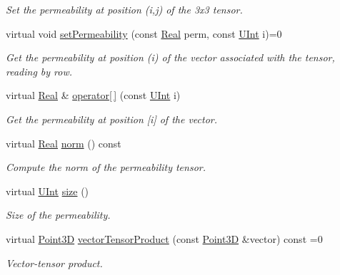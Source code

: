 \begin{DoxyCompactItemize}
\begin{DoxyCompactList}\small\item\em Set the permeability at position (i,j) of the 3x3 tensor. \end{DoxyCompactList}\item 
virtual void \hyperlink{classFVCode3D_1_1PermeabilityBase_a9c4837715f248789eac990148df9ad40}{set\+Permeability} (const \hyperlink{namespaceFVCode3D_a40c1f5588a248569d80aa5f867080e83}{Real} perm, const \hyperlink{namespaceFVCode3D_a4bf7e328c75d0fd504050d040ebe9eda}{U\+Int} i)=0
\begin{DoxyCompactList}\small\item\em Get the permeability at position (i) of the vector associated with the tensor, reading by row. \end{DoxyCompactList}\item 
virtual \hyperlink{namespaceFVCode3D_a40c1f5588a248569d80aa5f867080e83}{Real} \& \hyperlink{classFVCode3D_1_1PermeabilityBase_a01d49e30e1f7cd6856a9eab6195beed1}{operator\mbox{[}$\,$\mbox{]}} (const \hyperlink{namespaceFVCode3D_a4bf7e328c75d0fd504050d040ebe9eda}{U\+Int} i)
\begin{DoxyCompactList}\small\item\em Get the permeability at position \mbox{[}i\mbox{]} of the vector. \end{DoxyCompactList}\item 
virtual \hyperlink{namespaceFVCode3D_a40c1f5588a248569d80aa5f867080e83}{Real} \hyperlink{classFVCode3D_1_1PermeabilityBase_aec31bb1bd0086825bbf2924cce6fc463}{norm} () const 
\begin{DoxyCompactList}\small\item\em Compute the norm of the permeability tensor. \end{DoxyCompactList}\item 
virtual \hyperlink{namespaceFVCode3D_a4bf7e328c75d0fd504050d040ebe9eda}{U\+Int} \hyperlink{classFVCode3D_1_1PermeabilityBase_a5e4bd70177de114e9165f9b81852862c}{size} ()
\begin{DoxyCompactList}\small\item\em Size of the permeability. \end{DoxyCompactList}\item 
virtual \hyperlink{classFVCode3D_1_1Point3D}{Point3D} \hyperlink{classFVCode3D_1_1PermeabilityBase_aa60c227795b5b7dd6413ef90b211875e}{vector\+Tensor\+Product} (const \hyperlink{classFVCode3D_1_1Point3D}{Point3D} \&vector) const =0
\begin{DoxyCompactList}\small\item\em Vector-\/tensor product. \end{DoxyCompactList}\item 

\end{DoxyCompactItemize}
